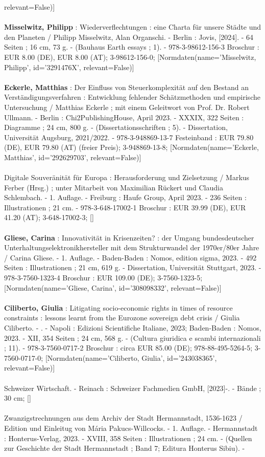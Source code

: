 \documentclass{article}
\begin{document}
\begin{multicols}{3}
relevant=False)]\\\\\textbf{Misselwitz, Philipp} : Wiederverflechtungen : eine Charta für unsere Städte und den Planeten / Philipp Misselwitz, Alan Organschi. - Berlin : Jovis, [2024]. - 64 Seiten ; 16 cm, 73 g. - (Bauhaus Earth essays ; 1). - 978-3-98612-156-3 Broschur : EUR 8.00 (DE), EUR 8.00 (AT); 3-98612-156-0; [Normdaten(name='Misselwitz, Philipp', id='3291476X', relevant=False)]\\\\\textbf{Eckerle, Matthias} : Der Einfluss von Steuerkomplexität auf den Bestand an Verständigungsverfahren : Entwicklung fehlender Schätzmethoden und empirische Untersuchung / Matthias Eckerle ; mit einem Geleitwort von Prof. Dr. Robert Ullmann. - Berlin : Chi2PublishingHouse, April 2023. - XXXIX, 322 Seiten : Diagramme ; 24 cm, 800 g. - (Dissertationsschriften ; 5). - Dissertation, Universität Augsburg, 2021/2022. - 978-3-948869-13-7 Festeinband : EUR 79.80 (DE), EUR 79.80 (AT) (freier Preis); 3-948869-13-8; [Normdaten(name='Eckerle, Matthias', id='292629703', relevant=False)]\\\\Digitale Souveränität für Europa : Herausforderung und Zielsetzung / Markus Ferber (Hrsg.) ; unter Mitarbeit von Maximilian Rückert und Claudia Schlembach. - 1. Auflage. - Freiburg : Haufe Group, April 2023. - 236 Seiten : Illustrationen ; 21 cm. - 978-3-648-17002-1 Broschur  : EUR 39.99 (DE), EUR 41.20 (AT); 3-648-17002-3; []\\\\\textbf{Gliese, Carina} : Innovativität in Krisenzeiten? : der Umgang bundesdeutscher Unterhaltungselektronikhersteller mit dem Strukturwandel der 1970er/80er Jahre / Carina Gliese. - 1. Auflage. - Baden-Baden : Nomos, edition sigma, 2023. - 492 Seiten : Illustrationen ; 21 cm, 619 g. - Dissertation, Universität Stuttgart, 2023. - 978-3-7560-1323-4 Broschur : EUR 109.00 (DE); 3-7560-1323-5; [Normdaten(name='Gliese, Carina', id='308098332', relevant=False)]\\\\\textbf{Ciliberto, Giulia} : Litigating socio-economic rights in times of resource constraints : lessons learnt from the Eurozone sovereign debt crisis / Giulia Ciliberto. - . - Napoli : Edizioni Scientifiche Italiane, 2023; Baden-Baden : Nomos, 2023. - XII, 354 Seiten ; 24 cm, 568 g. - (Cultura giuridica e scambi internazionali ; 11). - 978-3-7560-0717-2 Broschur : circa EUR 85.00 (DE); 978-88-495-5264-5; 3-7560-0717-0; [Normdaten(name='Ciliberto, Giulia', id='243038365', relevant=False)]\\\\Schweizer Wirtschaft. - Reinach : Schweizer Fachmedien GmbH, [2023]-. - Bände ; 30 cm; []\\\\Zwanzigstrechnungen aus dem Archiv der Stadt Hermannstadt, 1536-1623 / Edition und Einleitug von Mária Pakucs-Willcocks. - 1. Auflage. - Hermannstadt : Honterus-Verlag, 2023. - XVIII, 358 Seiten : Illustrationen ; 24 cm. - (Quellen zur Geschichte der Stadt Hermannstadt ; Band 7; Editura Honterus Sibiu). - 
\end{multicols}
\end{document}
